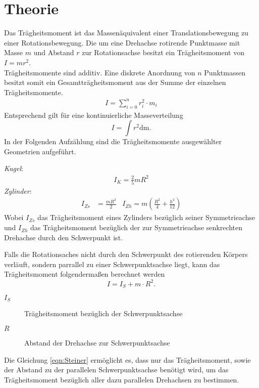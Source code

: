 \documentclass[parskip=half, bibliography=totoc]{scrartcl}
\begin{document}
\section{Theorie}
Das Trägheitsmoment ist das Massenäquivalent einer Translationsbewegung zu einer Rotationsbewegung. Die um eine Drehachse rotirende Punktmasse mit Masse $m$ und Abstand $r$ zur Rotationsachse besitzt ein Trägheitsmoment von $I = mr^2$.\\
Trägheitsmomente sind additiv.
Eine diskrete Anordnung von $n$ Punktmassen besitzt somit ein Gesamtträgheitsmoment aus der Summe der einzelnen Trägheitsmomente.
\begin{align*}
  I= \sum_{i = 0}^n r_i^2\cdot m_i
\end{align*}
Entsprechend gilt für eine kontinuierliche Masseverteilung
\begin{equation}
  \label{eqn:Trägheitsmoment}
  I = \int r^2 \mathup{dm}.
\end{equation}
In der Folgenden Aufzählung sind die Trägheitsmomente ausgewählter Geometrien aufgeführt.

\emph{Kugel}:
\begin{align*}
  I_K = \frac{2}{5}mR^2
\end{align*}
\emph{Zylinder}:
\begin{align*}
  I_{Zs} &= \frac{mR^2}{2} &
  I_{Zh} = m(\frac{R^2}{4} + \frac{h^2}{12})
\end{align*}
Wobei $I_{Zs}$ das Trägheitsmoment eines Zylinders bezüglich seiner Symmetrieachse und $I_{Zh}$ das Trägheitsmoment bezüglich der zur Symmetrieachse senkrechten Drehachse durch den Schwerpunkt ist.

Falls die Rotationsaches nicht durch den Schwerpunkt des rotierenden Körpers verläuft, sondern parrallel zu einer Schwerpunktsachse liegt, kann das Trägheitsmoment folgendermaßen berechnet werden
\begin{equation}
  \label{eqn:Steiner}
  I = I_S + m\cdot R^2.
\end{equation}
\begin{description}
  \item[$I_S$]Trägheitsmoment bezüglich der Schwerpunktsachse
  \item[$R$]Abstand der Drehachse zur Schwerpunktsachse
\end{description}
Die Gleichung \eqref{eqn:Steiner} ermöglicht es, dass nur das Trägheitsmoment, sowie der Abstand zu der parallelen Schwerpunktsachse benötigt wird, um das Trägheitsmoment bezüglich aller dazu parallelen Drehachsen zu bestimmen.
\end{document}
